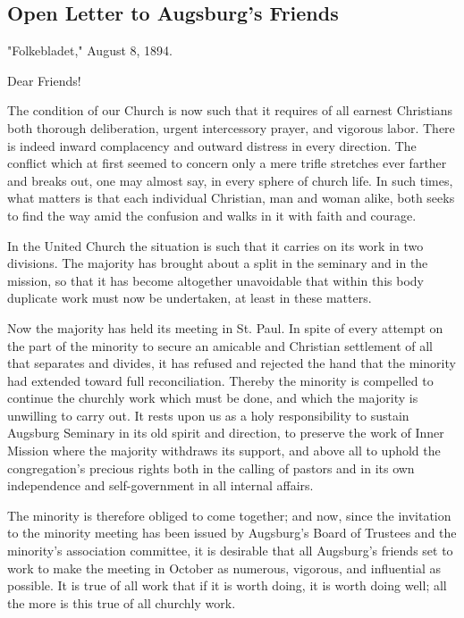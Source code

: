

\subsection{Open Letter to Augsburg’s Friends}

"Folkebladet," August 8, 1894.

Dear Friends!

The condition of our Church is now such that it requires of all earnest Christians both thorough deliberation, urgent intercessory prayer, and vigorous labor. There is indeed inward complacency and outward distress in every direction. The conflict which at first seemed to concern only a mere trifle stretches ever farther and breaks out, one may almost say, in every sphere of church life. In such times, what matters is that each individual Christian, man and woman alike, both seeks to find the way amid the confusion and walks in it with faith and courage.

In the United Church the situation is such that it carries on its work in two divisions. The majority has brought about a split in the seminary and in the mission, so that it has become altogether unavoidable that within this body duplicate work must now be undertaken, at least in these matters.

Now the majority has held its meeting in St. Paul. In spite of every attempt on the part of the minority to secure an amicable and Christian settlement of all that separates and divides, it has refused and rejected the hand that the minority had extended toward full reconciliation. Thereby the minority is compelled to continue the churchly work which must be done, and which the majority is unwilling to carry out. It rests upon us as a holy responsibility to sustain Augsburg Seminary in its old spirit and direction, to preserve the work of Inner Mission where the majority withdraws its support, and above all to uphold the congregation’s precious rights both in the calling of pastors and in its own independence and self-government in all internal affairs.

The minority is therefore obliged to come together; and now, since the invitation to the minority meeting has been issued by Augsburg’s Board of Trustees and the minority’s association committee, it is desirable that all Augsburg’s friends set to work to make the meeting in October as numerous, vigorous, and influential as possible. It is true of all work that if it is worth doing, it is worth doing well; all the more is this true of all churchly work.

